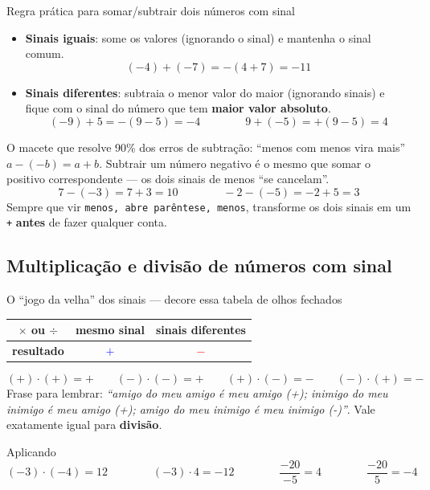 \documentclass[12pt,a4paper]{article}
\begin{document}
\begin{definicao}{Regra prática para somar/subtrair dois números com sinal}
\begin{itemize}[nosep]
  \item \textbf{Sinais iguais}: some os valores (ignorando o sinal) e mantenha o sinal comum.
  \[
  (-4)+(-7) = -(4+7) = -11
  \]
  \item \textbf{Sinais diferentes}: subtraia o menor valor do maior (ignorando sinais) e
  fique com o sinal do número que tem \textbf{maior valor absoluto}.
  \[
  (-9)+5 = -(9-5) = -4 \qquad\qquad 9+(-5) = +(9-5)=4
  \]
\end{itemize}
\end{definicao}

\begin{atencao}{O macete que resolve 90\% dos erros de subtração: ``menos com menos vira mais''}
$a - (-b) = a+b$. Subtrair um número negativo é o mesmo que somar o
positivo correspondente — os dois sinais de menos ``se cancelam''.
\[
7 - (-3) = 7+3 = 10 \qquad\qquad -2-(-5) = -2+5 = 3
\]
Sempre que vir \texttt{menos, abre parêntese, menos}, transforme os dois
sinais em um \texttt{+} \textbf{antes} de fazer qualquer conta.
\end{atencao}

\subsection{Multiplicação e divisão de números com sinal}

\begin{macete}{O ``jogo da velha'' dos sinais — decore essa tabela de olhos fechados}
\begin{center}
\renewcommand{\arraystretch}{1.6}
\begin{tabular}{c|cc}
$\times$ ou $\div$ & \textbf{mesmo sinal} & \textbf{sinais diferentes}\\
\hline
\textbf{resultado} & \textcolor{blue}{$+$} & \textcolor{red}{$-$}
\end{tabular}
\end{center}
\[
(+)\cdot(+) = + \qquad (-)\cdot(-) = + \qquad (+)\cdot(-) = - \qquad (-)\cdot(+) = -
\]
Frase para lembrar: \emph{``amigo do meu amigo é meu amigo (+); inimigo do
meu inimigo é meu amigo (+); amigo do meu inimigo é meu inimigo (-)''}.
Vale exatamente igual para \textbf{divisão}.
\end{macete}

\begin{exemplo}{Aplicando}
\[
(-3)\cdot(-4) = 12 \qquad\qquad (-3)\cdot 4 = -12 \qquad\qquad \frac{-20}{-5}=4 \qquad\qquad \frac{-20}{5}=-4
\]
\end{exemplo}
\end{document}
